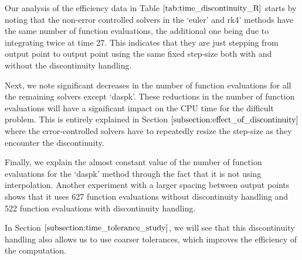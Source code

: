 Our analysis of the efficiency data in Table $\ref{tab:time_discontinuity_R}$ starts by noting that the non-error controlled solvers in the `euler' and rk4' methods have the same number of function evaluations, the additional one being due to integrating twice at time 27. This indicates that they are just stepping from output point to output point using the same fixed step-size both with and without the discontinuity handling.

Next, we note significant decreases in the number of function evaluations for all the remaining solvers except `daspk'. These reductions in the number of function evaluations will have a significant impact on the CPU time for the difficult problem. This is entirely explained in Section $\ref{subsection:effect_of_discontinuity}$ where the error-controlled solvers have to repeatedly resize the step-size as they encounter the discontinuity.

Finally, we explain the almost constant value of the number of function evaluations for the `daspk' method through the fact that it is not using interpolation. Another experiment with a larger spacing between output points shows that it uses 627 function evaluations without discontinuity handling and 522 function evaluations with discontinuity handling.

In Section $\ref{subsection:time_tolerance_study}$, we will see that this discontinuity handling also allows us to use coarser tolerances, which improves the efficiency of the computation.

